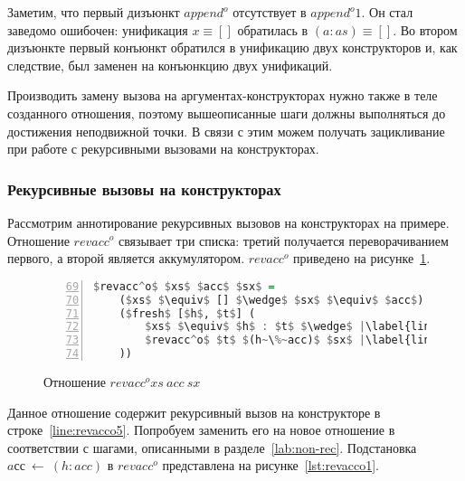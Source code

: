 Заметим, что первый дизъюнкт $append^o$ отсутствует в $append^o1$.
Он стал заведомо ошибочен: унификация $x \equiv []$ обратилась в $(a:as) \equiv []$.
Во втором дизъюнкте первый конъюнкт обратился в унификацию двух конструкторов и, как следствие, был заменен на конъюнкцию двух унификаций.

Производить замену вызова на аргументах-конструкторах нужно также в теле созданного отношения, поэтому вышеописанные шаги должны выполняться до достижения неподвижной точки.
В связи с этим можем получать зацикливание при работе с рекурсивными вызовами на конструкторах.


\subsubsection{Рекурсивные вызовы на конструкторах}
\label{lab:rec}

Рассмотрим аннотирование рекурсивных вызовов на конструкторах на примере.
Отношение $revacc^o$ связывает три списка: третий получается переворачиванием первого, а второй является аккумулятором.
$revacc^o$ приведено на рисунке~\ref{lst:revacco}.

\begin{figure}[h!]
  \begin{center}
  \begin{minipage}{0.4\textwidth}
  \begin{lstlisting}[language=Haskell, frame=single, numbers=left,numberstyle=\small, firstnumber=69, escapechar=|]
  $revacc^o$ $xs$ $acc$ $sx$ =
    ($xs$ $\equiv$ [] $\wedge$ $sx$ $\equiv$ $acc$) $\vee$ |\label{line:revacco2}|
    ($fresh$ [$h$, $t$] (
        $xs$ $\equiv$ $h$ : $t$ $\wedge$ |\label{line:revacco4}|
        $revacc^o$ $t$ $(h~\%~acc)$ $sx$ |\label{line:revacco5}|
    ))
    \end{lstlisting}
  \end{minipage}
  \end{center}
  \caption{Отношение $revacc^o xs \ acc \ sx$}
  \label{lst:revacco}
\end{figure}

Данное отношение содержит рекурсивный вызов на конструкторе в строке~\ref{line:revacco5}.
Попробуем заменить его на новое отношение в соответствии с шагами, описанными в разделе~\ref{lab:non-rec}.
Подстановка $aсс~\gets~(h:acc)$ в $revacc^o$ представлена на рисунке~\ref{lst:revacco1}.

